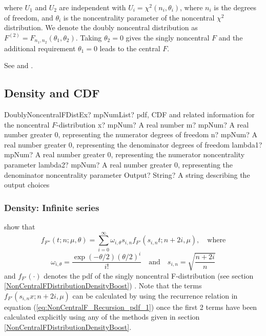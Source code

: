 where $U_1$ and $U_2$ are independent with $U_i = \chi^2(n_i,\theta_i)$, where $n_i$ is the degrees of freedom, and $\theta_i$ is the noncentrality parameter of the noncentral $\chi^2$ distribution. We denote the doubly noncentral distribution as $F^{(2)} = F_{n_1, n_2}(\theta_1, \theta_2)$. Taking $\theta_2=0$ gives the singly noncentral $F$ and the additional requirement  $\theta_1=0$ leads to the central $F$.

See \cite{Paolella_2007} and \cite{Paolella_2006}.



\subsection{Density and CDF}

\begin{mpFunctionsExtract}
	\mpFunctionSixNotImplemented
	{DoublyNoncentralFDistEx? mpNumList? pdf, CDF and related information for the noncentral $F$-distribution}
	{x? mpNum? A real number}
	{m? mpNum? A real number greater 0, representing the numerator  degrees of freedom}
	{n? mpNum? A real number greater 0, representing the denominator degrees of freedom}
	{lambda1? mpNum? A real number greater 0, representing the numerator noncentrality parameter}
	{lambda2? mpNum? A real number greater 0, representing the denominator noncentrality parameter}
	{Output? String? A string describing the output choices}
\end{mpFunctionsExtract}




\subsubsection{Density: Infinite series}
\label{DoublyNonCentralFDistributionDensity}

\cite{Butler_2002} show that 
\begin{equation}  \label{eq:DoublyNonCentralF_Def_density}
	f_{F''}(t;n;\mu,\theta) = \sum_{i=0}^{\infty} \omega_{i,\theta} s_{i,n} f_{F'}(s_{i,n} t;n+2i,\mu), \quad \text{where}
\end{equation}
\begin{equation}  \label{eq:DoublyNonCentralF_Def_Factors}
	\omega_{i,\theta} = \frac{\exp(-\theta/2)(\theta/2)^i}{i!}  \quad \text{and}  \quad s_{i,n}=\sqrt{\frac{n+2i}{n}}
\end{equation}
and $f_{F'}(\cdot)$ denotes the pdf of the singly noncentral F-distribution 
(see section \ref{NonCentralFDistributionDensityBoost})
. Note that the terms $f_{F'}(s_{i,n} x;n+2i,\mu)$ can be calculated by using the recurrence relation in equation  (\ref{eq:NonCentralF_Recursion_pdf_1})  once the first 2 terms have been calculated explicitly using any of the methods given in section  
\ref{NonCentralFDistributionDensityBoost}.




